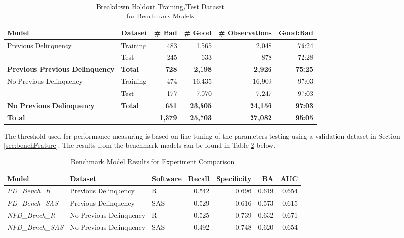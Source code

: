 \begin{table}[H]
	\centering\
	\resizebox{\textwidth}{!}
	{
		\begin{tabular}{l l r r r r}
			\hline
			\textbf{Model} &  \textbf{Dataset} & \textbf{\# Bad} & \textbf{\# Good} & \textbf{\# Observations} & \textbf{Good:Bad} \\
			\hline
			Previous Delinquency & Training       & 483 & 1,565 & 2,048 & 76:24\\
			          & Test & 245 & 633 & 878 & 72:28\\\hline
			\textbf{Previous Previous Delinquency}     & \textbf{Total} & \textbf{728} & \textbf{2,198} & \textbf{2,926} & \textbf{75:25} \\
			\hline
			No Previous Delinquency & Training & 474 & 16,435 & 16,909 & 97:03 \\ 
			          & Test & 177 & 7,070 & 7,247 & 97:03 	\\\hline
			\textbf{No Previous Delinquency}     & \textbf{Total} & \textbf{651} & \textbf{23,505} & \textbf{24,156} & \textbf{97:03} \\
			\hline
			\textbf{Total } 	&     	     & \textbf{1,379} & \textbf{25,703} & \textbf{27,082} & \textbf{95:05}\\ \hline
		\end{tabular}
	}
	\caption{Breakdown Holdout Training/Test Dataset \\for Benchmark Models}
	\label{table:benchmark_holdout_train_test}
\end{table}

The threshold used for performance measuring is based on fine tuning of the parameters testing using a validation dataset in Section \ref{sec:benchFeature}. The results from the benchmark models can be found in Table \ref{table:benchmodel} below.

\begin{table}[H]
	\centering
	\resizebox{\textwidth}{!}
	{\footnotesize
		\begin{tabular}{l l l r r r r}
			\hline
			\textbf{Model} & \textbf{Dataset} & \textbf{Software} & \textbf{Recall} & \textbf{Specificity} & \textbf{BA} & \textbf{AUC}  \\ \hline
			\textit{PD\_Bench\_R} & Previous Delinquency & R & 0.542 & 0.696 & 0.619 & 0.654   \\ 
			\textit{PD\_Bench\_SAS} & Previous Delinquency & SAS & 0.529 & 0.616 & 0.573 & 0.615   \\ \hline
			\textit{NPD\_Bench\_R} & No Previous Delinquency & R & 0.525 & 0.739 & 0.632 & 0.671   \\ 
			\textit{NPD\_Bench\_SAS} & No Previous Delinquency & SAS & 0.492 & 0.748 & 0.620 & 0.654   \\ \hline
		\end{tabular}
	}
	\caption{Benchmark Model Results for Experiment Comparison}
	\label{table:benchmodel}
\end{table}

